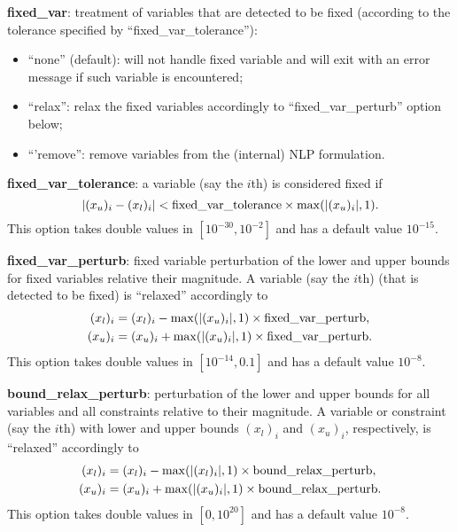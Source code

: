 \noindent \textbf{fixed\_var}: treatment of variables that are detected to be fixed (according to the tolerance specified by ``fixed\_var\_tolerance''):
\begin{itemize}
\item ``none'' (default): will not handle fixed variable and will exit with an error message if such variable is encountered;
\item ``relax'':  relax the fixed variables accordingly to ``fixed\_var\_perturb'' option below;
\item ``'remove'': remove variables from the (internal) NLP formulation.
\end{itemize}
\medskip

\noindent \textbf{fixed\_var\_tolerance}: a variable (say the $i$th) is considered fixed if 
\begin{displaymath}
|(x_u)_i-(x_l)_i| < \textnormal{fixed\_var\_tolerance} \times \max(|(x_u)_i|,1).
\end{displaymath}
This option takes double values in $[10^{-30}, 10^{-2}]$ and has a default value $10^{-15}$.
\medskip

\noindent \textbf{fixed\_var\_perturb}: fixed variable perturbation of the lower and upper bounds for fixed variables relative their  magnitude. A variable (say the $i$th) (that is detected to be fixed) is ``relaxed'' accordingly to 
\begin{align*}
(x_l)_i & =  (x_l)_i -  \max(|(x_u)_i|,1) \times \textnormal{fixed\_var\_perturb}, \\
(x_u)_i & =  (x_u)_i +  \max(|(x_u)_i|,1) \times \textnormal{fixed\_var\_perturb}.
\end{align*}
This option takes double values in $[10^{-14}, 0.1]$ and has a default value $10^{-8}$.
\medskip

\noindent \textbf{bound\_relax\_perturb}: perturbation of the lower and upper bounds for all variables and all constraints relative to their magnitude. A variable or constraint (say the $i$th) with lower and upper bounds $(x_l)_i$ and $(x_u)_i$, respectively,  is ``relaxed'' accordingly to 
\begin{align*}
(x_l)_i & =  (x_l)_i -  \max(|(x_l)_i|,1) \times \textnormal{bound\_relax\_perturb}, \\
(x_u)_i & =  (x_u)_i +  \max(|(x_u)_i|,1) \times \textnormal{bound\_relax\_perturb}.
\end{align*}
This option takes double values in $[0, 10^{20}]$ and has a default value $10^{-8}$.
\medskip

